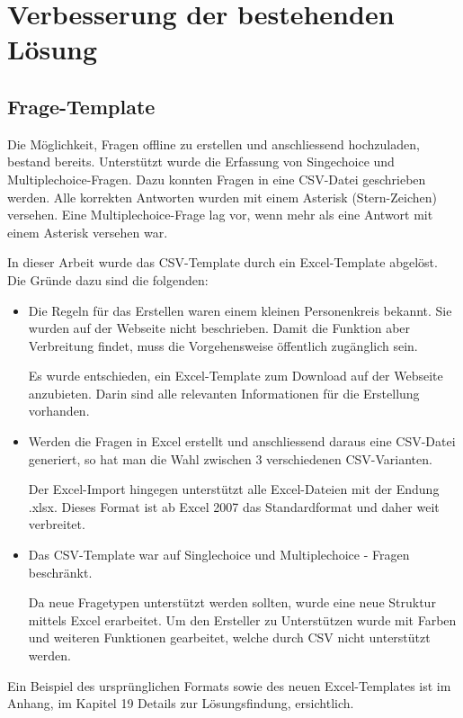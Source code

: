 
\section{Verbesserung der bestehenden Lösung}

\subsection{Frage-Template}
Die Möglichkeit, Fragen offline zu erstellen und anschliessend hochzuladen, bestand bereits. Unterstützt wurde die Erfassung von Singechoice und Multiplechoice-Fragen. Dazu konnten Fragen in eine CSV-Datei geschrieben werden. Alle korrekten Antworten wurden mit einem Asterisk (Stern-Zeichen) versehen. Eine Multiplechoice-Frage lag vor, wenn mehr als eine Antwort mit einem Asterisk versehen war.

In dieser Arbeit wurde das CSV-Template durch ein Excel-Template abgelöst. Die Gründe dazu sind die folgenden:
\begin{itemize}
	\item Die Regeln für das Erstellen waren einem kleinen Personenkreis bekannt. Sie wurden auf der Webseite nicht beschrieben. Damit die Funktion aber Verbreitung findet, muss die Vorgehensweise öffentlich zugänglich sein.
	
	Es wurde entschieden, ein Excel-Template zum Download auf der Webseite anzubieten. Darin sind alle relevanten Informationen für die Erstellung vorhanden.
	
	\item Werden die Fragen in Excel erstellt und anschliessend daraus eine CSV-Datei generiert, so hat man die Wahl zwischen 3 verschiedenen CSV-Varianten.
	
	Der Excel-Import hingegen unterstützt alle Excel-Dateien mit der Endung .xlsx. Dieses Format ist ab Excel 2007 das Standardformat und daher weit verbreitet.
	\cite{microsoft2016}
	
	\item Das CSV-Template war auf Singlechoice und Multiplechoice - Fragen beschränkt.
	
	Da neue Fragetypen unterstützt werden sollten, wurde eine neue Struktur mittels Excel erarbeitet. Um den Ersteller zu Unterstützen wurde mit Farben und weiteren Funktionen gearbeitet, welche durch CSV nicht unterstützt werden.
\end{itemize}

Ein Beispiel des ursprünglichen Formats sowie des neuen Excel-Templates ist im Anhang, im Kapitel 19 Details zur Lösungsfindung, ersichtlich.

